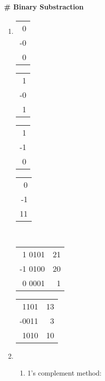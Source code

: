 \documentclass[12pt,oneside,a4paper]{book}
\theoremstyle{remark}
\theoremstyle{definition}
\begin{document}
\paragraph{\# Binary Substraction}
\begin{enumerate}
    \item \begin{tabular}{r}
              0  \\
              -0 \\\hline
              0
          \end{tabular} \qquad \begin{tabular}{r}
              1  \\
              -0 \\\hline
              1
          \end{tabular} \qquad \begin{tabular}{r}
              1  \\
              -1 \\\hline
              0
          \end{tabular} \qquad \begin{tabular}{r}
              0  \\
              -1 \\\hline
              11
          \end{tabular}\\
          \begin{tabular}{r|r}
              1 0101  & 21 \\
              -1 0100 & 20 \\\hline
              0 0001  & 1
          \end{tabular} \qquad\qquad\begin{tabular}{r|r}
              1101  & 13 \\
              -0011 & 3  \\\hline
              1010  & 10
          \end{tabular}
    \item \begin{enumerate}[label=(\roman*)]
              \item 1's complement method:


\end{enumerate}
\end{enumerate}
\end{document}
